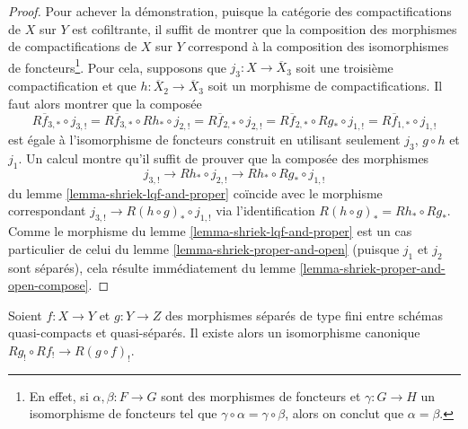 \begin{proof}
\medskip\noindent
Pour achever la démonstration, puisque la catégorie des compactifications de $X$ sur $Y$
est cofiltrante, il suffit de montrer que la composition des morphismes de
compactifications de $X$ sur $Y$ correspond à la composition
des isomorphismes de foncteurs\footnote{En effet, si $\alpha, \beta : F \to G$
sont des morphismes de foncteurs et $\gamma : G \to H$ un isomorphisme
de foncteurs tel que $\gamma \circ \alpha = \gamma \circ \beta$, alors
on conclut que $\alpha = \beta$.}. Pour cela, supposons que
$j_3 : X \to \overline{X}_3$
soit une troisième compactification et que $h : \overline{X}_2 \to \overline{X}_3$
soit un morphisme de compactifications. Il faut alors montrer que la
composée
$$
R\overline{f}_{3, *} \circ j_{3, !} =
R\overline{f}_{3, *} \circ Rh_* \circ j_{2, !} =
R\overline{f}_{2, *} \circ j_{2, !} =
R\overline{f}_{2, *} \circ Rg_* \circ j_{1, !} =
R\overline{f}_{1, *} \circ j_{1, !}
$$
est égale à l'isomorphisme de foncteurs construit en utilisant seulement
$j_3$, $g \circ h$ et $j_1$. Un calcul montre qu'il suffit de
prouver que la composée des morphismes
$$
j_{3, !} \to Rh_* \circ j_{2, !} \to Rh_* \circ Rg_* \circ j_{1, !}
$$
du lemme \ref{lemma-shriek-lqf-and-proper} coïncide avec le morphisme correspondant
$j_{3, !} \to R(h \circ g)_* \circ j_{1, !}$
via l'identification $R(h \circ g)_* = Rh_* \circ Rg_*$.
Comme le morphisme du lemme \ref{lemma-shriek-lqf-and-proper}
est un cas particulier de celui du lemme \ref{lemma-shriek-proper-and-open}
(puisque $j_1$ et $j_2$ sont séparés), cela résulte immédiatement du
lemme \ref{lemma-shriek-proper-and-open-compose}.
\end{proof}

\begin{lemma}
\label{lemma-shriek-composition}
Soient $f : X \to Y$ et $g : Y \to Z$ des morphismes séparés de type fini
entre schémas quasi-compacts et quasi-séparés. Il existe alors un
isomorphisme canonique $Rg_! \circ Rf_! \to R(g \circ f)_!$.
\end{lemma}


